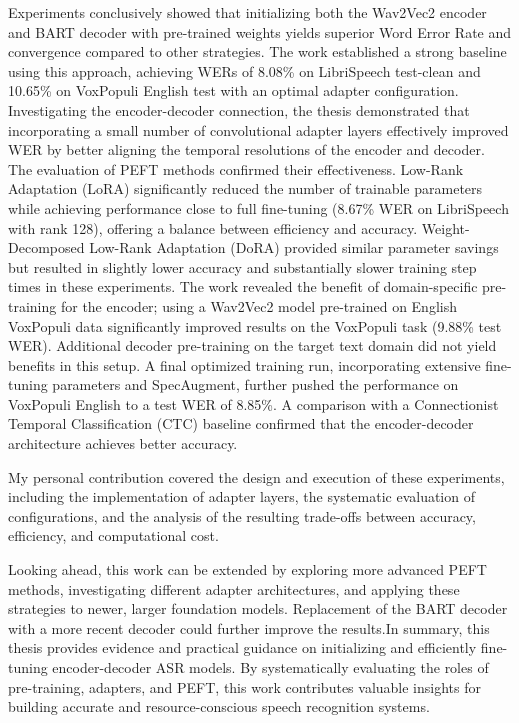 Experiments conclusively showed that initializing both the Wav2Vec2 encoder and BART decoder with pre-trained weights yields superior Word Error Rate and convergence compared to other strategies. The work established a strong baseline using this approach, achieving WERs of 8.08\% on LibriSpeech test-clean and 10.65\% on VoxPopuli English test with an optimal adapter configuration. Investigating the encoder-decoder connection, the thesis demonstrated that incorporating a small number of convolutional adapter layers effectively improved WER by better aligning the temporal resolutions of the encoder and decoder. The evaluation of PEFT methods confirmed their effectiveness. Low-Rank Adaptation (LoRA) significantly reduced the number of trainable parameters while achieving performance close to full fine-tuning (8.67\% WER on LibriSpeech with rank 128), offering a balance between efficiency and accuracy. Weight-Decomposed Low-Rank Adaptation (DoRA) provided similar parameter savings but resulted in slightly lower accuracy and substantially slower training step times in these experiments. The work revealed the benefit of domain-specific pre-training for the encoder; using a Wav2Vec2 model pre-trained on English VoxPopuli data significantly improved results on the VoxPopuli task (9.88\% test WER). Additional decoder pre-training on the target text domain did not yield benefits in this setup.  A final optimized training run, incorporating extensive fine-tuning parameters and SpecAugment, further pushed the performance on VoxPopuli English to a test WER of 8.85\%. A comparison with a Connectionist Temporal Classification (CTC) baseline confirmed that the encoder-decoder architecture achieves better accuracy.

My personal contribution covered the design and execution of these experiments, including the implementation of adapter layers, the systematic evaluation of configurations, and the analysis of the resulting trade-offs between accuracy, efficiency, and computational cost.

Looking ahead, this work can be extended by exploring more advanced PEFT methods, investigating different adapter architectures, and applying these strategies to newer, larger foundation models. Replacement of the BART decoder with a more recent decoder could further improve the results.In summary, this thesis provides evidence and practical guidance on initializing and efficiently fine-tuning encoder-decoder ASR models. By systematically evaluating the roles of pre-training, adapters, and PEFT, this work contributes valuable insights for building accurate and resource-conscious speech recognition systems.


